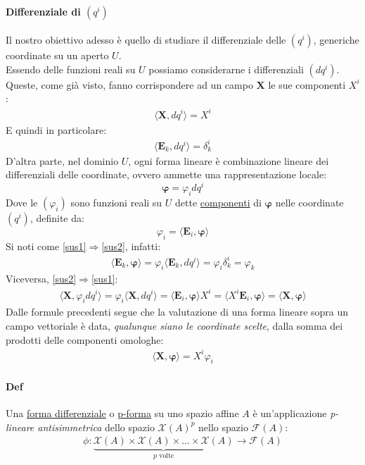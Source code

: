 \paragraph{Differenziale di $(q^i)$} Il nostro obiettivo adesso è quello di studiare il differenziale delle $(q^i)$, generiche coordinate su un aperto $U$.\\
Essendo delle funzioni reali su $U$ possiamo considerarne i differenziali $(dq^i)$. Queste, come già visto, fanno corrispondere ad un campo $\mathbf{X}$ le sue componenti $X^i$:
\begin{align*}
    \langle\mathbf{X},dq^i\rangle=X^i
\end{align*}
E quindi in particolare:
\begin{align*}
    \langle \mathbf{E}_k,dq^i\rangle=\delta_k^i
\end{align*}
D'altra parte, nel dominio $U$, ogni forma lineare è combinazione lineare dei differenziali delle coordinate, ovvero ammette una rappresentazione locale:
\begin{equation}
    \label{sus1}
    \mathbf{\varphi}=\varphi_idq^i
\end{equation}
Dove le $(\varphi_i)$ sono funzioni reali su $U$ dette \underline{componenti} di $\mathbf{\varphi}$ nelle coordinate $(q^i)$, definite da:
\begin{equation}
    \label{sus2}
    \varphi_i=\langle\mathbf{E}_i,\mathbf{\varphi}\rangle
\end{equation}
Si noti come \ref{sus1}$\Rightarrow$\ref{sus2}, infatti:
\begin{align*}
    \langle \mathbf{E}_k,\mathbf{\varphi}\rangle = \varphi_i\langle \mathbf{E}_k,dq^i\rangle = \varphi_i \delta_k^i=\varphi_k
\end{align*}
Viceversa, \ref{sus2}$\Rightarrow$\ref{sus1}:
\begin{align*}
    \langle \mathbf{X},\varphi_idq^i\rangle=\varphi_i \langle \mathbf{X},dq^i\rangle= \langle \mathbf{E}_i, \mathbf{\varphi}\rangle X^i=\langle X^i\mathbf{E}_i, \mathbf{\varphi}\rangle =\langle \mathbf{X}, \mathbf{\varphi}\rangle
\end{align*}
Dalle formule precedenti segue che la valutazione di una forma lineare sopra un campo vettoriale è data, \textit{qualunque siano le coordinate scelte}, dalla somma dei prodotti delle componenti omologhe:
\begin{align*}
    \boxed{\langle \mathbf{X},\mathbf{\varphi}\rangle = X^i\varphi_i}
\end{align*}
%
\paragraph{Def} Una \underline{forma differenziale} o \underline{p-forma} su uno spazio affine $A$ è un'applicazione \textit{p-lineare antisimmetrica} dello spazio $\mathcal{X}(A)^p$ nello spazio $\mathcal{F}(A)$:
\begin{align*}
    \phi \colon \underbrace{\mathcal{X}(A)\times \mathcal{X}(A)\times \dots \times \mathcal{X}(A)}_{p \text{ volte}}\to \mathcal{F}(A)
\end{align*}
